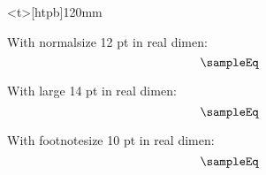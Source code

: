\clearpage
\begin{minipage}<t>[htpb]{120mm}
		\vspace*{10mm}
			{\normalsize With normalsize 12 pt in real dimen:
				\[ \sampleEq \]\par}

			{\large With large 14 pt in real dimen:
				\[ \sampleEq \]\par}

			{\footnotesize With footnotesize 10 pt in real dimen:
				\[ \sampleEq \]\par}
\end{minipage}



\endinput